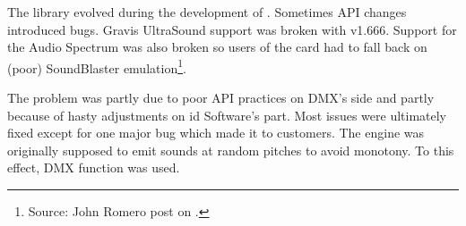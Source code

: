 The library evolved during the development of \doom. Sometimes API changes introduced bugs. Gravis UltraSound support was broken with v1.666. Support for the Audio Spectrum was also broken so users of the card had to fall back on (poor) SoundBlaster emulation\footnote{Source: John Romero post on .}.\\
\par
The problem was partly due to poor API practices on DMX's side and partly because of hasty adjustments on id Software's part. Most issues were ultimately fixed except for one major bug which made it to customers. The engine was originally supposed to emit sounds at random pitches to avoid monotony. To this effect, DMX function  was used.\\
\par
{}






